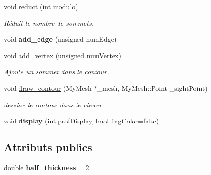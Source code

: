\begin{DoxyCompactItemize}
void \hyperlink{classContour_a82c764d0bacfbdaea423679ce7a43661}{reduct} (int modulo)
\begin{DoxyCompactList}\small\item\em Réduit le nombre de sommets. \end{DoxyCompactList}\item 
\mbox{\label{classContour_a23c1d89a386157db31266aed7f742b71}} 
void {\bfseries add\+\_\+edge} (unsigned num\+Edge)
\item 
void \hyperlink{classContour_a2b6191371b3ba0cd72e4c26da74e9b58}{add\+\_\+vertex} (unsigned num\+Vertex)
\begin{DoxyCompactList}\small\item\em Ajoute un sommet dans le contour. \end{DoxyCompactList}\item 
void \hyperlink{classContour_ad5d4922909fd2dab2c660a85dc339df1}{draw\+\_\+contour} (My\+Mesh $\ast$\+\_\+mesh, My\+Mesh\+::\+Point \+\_\+sight\+Point)
\begin{DoxyCompactList}\small\item\em dessine le contour dans le viewer \end{DoxyCompactList}\item 
\mbox{\label{classContour_ae657948e295c643c2ebfbb451d9aa7f4}} 
void {\bfseries display} (int prof\+Display, bool flag\+Color=false)
\end{DoxyCompactItemize}
\subsection*{Attributs publics}
\begin{DoxyCompactItemize}
\item 
\mbox{\label{classContour_aa98615f98c08bec572067bf1bbb2125a}} 
double {\bfseries half\+\_\+thickness} = 2
\end{DoxyCompactItemize}

